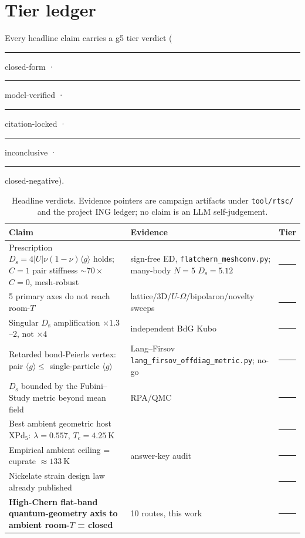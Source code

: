 \documentclass[11pt,a4paper]{article}
\newcommand{\tierdisc}[1]{\textcolor{#1}{\rule[0.05ex]{1.0ex}{1.0ex}}}
\newcommand{\tierBlue}{\tierdisc{blue!70!black}}   %
\newcommand{\tierGreen}{\tierdisc{green!60!black}} %
\newcommand{\tierYellow}{\tierdisc{yellow!85!black}} %
\newcommand{\tierOrange}{\tierdisc{orange!90!black}} %
\newcommand{\tierRed}{\tierdisc{red!80!black}}     %
\newcommand{\qgg}{\langle g \rangle}
\newcommand{\Ds}{D_{\mathrm{s}}}
\begin{document}
\section{Tier ledger}
Every headline claim carries a g5 tier verdict (\tierBlue{} closed-form ·
\tierGreen{} model-verified · \tierYellow{} citation-locked · \tierOrange{}
inconclusive · \tierRed{} closed-negative).
\begin{table}[h]
\centering\small
\caption{Headline verdicts. Evidence pointers are campaign artifacts under \texttt{tool/rtsc/} and
the project ING ledger; no claim is an LLM self-judgement.}
\begin{tabular}{@{}p{6.4cm}p{5.9cm}l@{}}
\toprule
Claim & Evidence & Tier \\
\midrule
Prescription $\Ds = 4|U|\nu(1-\nu)\qgg$ holds; $C{=}1$ pair stiffness $\sim 70\times$ $C{=}0$, mesh-robust & sign-free ED, \texttt{flatchern\_meshconv.py}; many-body $N{=}5$ $\Ds{=}5.12$ & \tierGreen{} \\
5 primary axes do not reach room-$T$ & lattice/3D/$U$-$\Omega$/bipolaron/novelty sweeps & \tierRed{} \\
Singular $\Ds$ amplification $\times1.3$--$2$, not $\times4$ & independent BdG Kubo & \tierRed{} \\
Retarded bond-Peierls vertex: pair $\qgg \le$ single-particle $\qgg$ & Lang--Firsov \texttt{lang\_firsov\_offdiag\_metric.py}; no-go~\citep{nogo2026} & \tierRed{} \\
$\Ds$ bounded by the Fubini--Study metric beyond mean field & RPA/QMC~\citep{tam2024,herzog2022} & \tierYellow{} \\
Best ambient geometric host XPd$_5$: $\lambda{=}0.557$, $T_c{=}\SI{4.25}{\kelvin}$ & \citep{xpd5} & \tierYellow{} \\
Empirical ambient ceiling = cuprate $\approx\SI{133}{\kelvin}$ & answer-key audit & \tierYellow{} \\
Nickelate strain design law already published & \citep{nickelate2026} & \tierYellow{} \\
\textbf{High-Chern flat-band quantum-geometry axis to ambient room-$T$ = closed} & 10 routes, this work & \tierRed{} \\
\bottomrule
\end{tabular}
\end{table}
\end{document}
